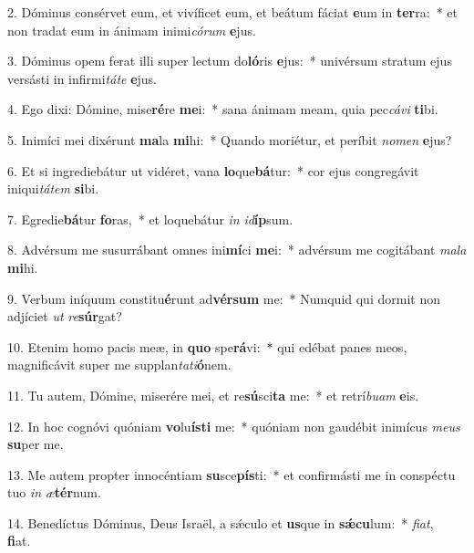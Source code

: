 2. Dóminus consérvet eum, et vivíficet eum, et beátum fáciat \textbf{e}um in \textbf{ter}ra:~*  et non tradat eum in ánimam inimi\textit{có}\textit{rum} \textbf{e}jus.\

3. Dóminus opem ferat illi super lectum do\textbf{ló}ris \textbf{e}jus:~*  univérsum stratum ejus versásti in infirmi\textit{tá}\textit{te} \textbf{e}jus.\

4. Ego dixi: Dómine, mise\textbf{ré}re \textbf{me}i:~*  sana ánimam meam, quia pec\textit{cá}\textit{vi} \textbf{ti}bi.\

5. Inimíci mei dixérunt \textbf{ma}la \textbf{mi}hi:~*  Quando moriétur, et períbit \textit{no}\textit{men} \textbf{e}jus?\

6. Et si ingrediebátur ut vidéret, vana \textbf{lo}que\textbf{bá}tur:~*  cor ejus congregávit iniqui\textit{tá}\textit{tem} \textbf{si}bi.\

7. Egredie\textbf{bá}tur \textbf{fo}ras,~*  et loquebátur \textit{in} \textit{id}\textbf{íp}sum.\

8. Advérsum me susurrábant omnes ini\textbf{mí}ci \textbf{me}i:~*  advérsum me cogitábant \textit{ma}\textit{la} \textbf{mi}hi.\

9. Verbum iníquum constitu\textbf{é}runt ad\textbf{vér}\textbf{sum} me:~*  Numquid qui dormit non adjíciet \textit{ut} \textit{re}\textbf{súr}gat?\

10. Etenim homo pacis meæ, in \textbf{quo} spe\textbf{rá}vi:~*  qui edébat panes meos, magnificávit super me supplan\textit{ta}\textit{ti}\textbf{ó}nem.\

11. Tu autem, Dómine, miserére mei, et re\textbf{sú}sci\textbf{ta} me:~*  et retrí\textit{bu}\textit{am} \textbf{e}is.\

12. In hoc cognóvi quóniam \textbf{vo}lu\textbf{ís}\textbf{ti} me:~*  quóniam non gaudébit inimícus \textit{me}\textit{us} \textbf{su}per me.\

13. Me autem propter innocéntiam \textbf{su}sce\textbf{pís}ti:~*  et confirmásti me in conspéctu tuo \textit{in} \textit{æ}\textbf{tér}num.\

14. Benedíctus Dóminus, Deus Israël, a sǽculo et \textbf{us}que in \textbf{sǽ}\textbf{cu}lum:~*  \textit{fi}\textit{at}, \textbf{fi}at.\

